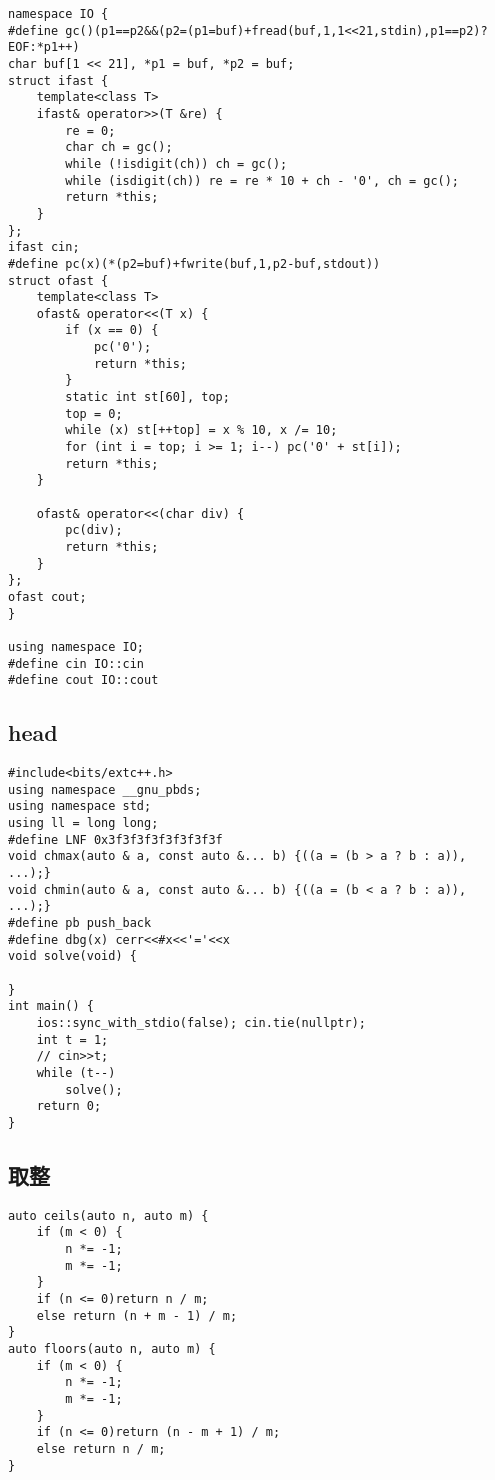 \documentclass[a4paper,10pt]{article}
\begin{document}
\noindent\begin{lstlisting}
namespace IO {
#define gc()(p1==p2&&(p2=(p1=buf)+fread(buf,1,1<<21,stdin),p1==p2)?EOF:*p1++)
char buf[1 << 21], *p1 = buf, *p2 = buf;
struct ifast {
    template<class T>
    ifast& operator>>(T &re) {
        re = 0;
        char ch = gc();
        while (!isdigit(ch)) ch = gc();
        while (isdigit(ch)) re = re * 10 + ch - '0', ch = gc();
        return *this;
    }
};
ifast cin;
#define pc(x)(*(p2=buf)+fwrite(buf,1,p2-buf,stdout))
struct ofast {
    template<class T>
    ofast& operator<<(T x) {
        if (x == 0) {
            pc('0');
            return *this;
        }
        static int st[60], top;
        top = 0;
        while (x) st[++top] = x % 10, x /= 10;
        for (int i = top; i >= 1; i--) pc('0' + st[i]);
        return *this;
    }

    ofast& operator<<(char div) {
        pc(div);
        return *this;
    }
};
ofast cout;
}

using namespace IO;
#define cin IO::cin
#define cout IO::cout\end{lstlisting}

\subsection{head}
\thispagestyle{fancy}

\noindent\begin{lstlisting}
#include<bits/extc++.h>
using namespace __gnu_pbds;
using namespace std;
using ll = long long;
#define LNF 0x3f3f3f3f3f3f3f3f
void chmax(auto & a, const auto &... b) {((a = (b > a ? b : a)), ...);}
void chmin(auto & a, const auto &... b) {((a = (b < a ? b : a)), ...);}
#define pb push_back
#define dbg(x) cerr<<#x<<'='<<x
void solve(void) {

}
int main() {
    ios::sync_with_stdio(false); cin.tie(nullptr);
    int t = 1;
    // cin>>t;
    while (t--)
        solve();
    return 0;
}\end{lstlisting}

\subsection{取整}
\thispagestyle{fancy}

\noindent\begin{lstlisting}
auto ceils(auto n, auto m) {
    if (m < 0) {
        n *= -1;
        m *= -1;
    }
    if (n <= 0)return n / m;
    else return (n + m - 1) / m;
}
auto floors(auto n, auto m) {
    if (m < 0) {
        n *= -1;
        m *= -1;
    }
    if (n <= 0)return (n - m + 1) / m;
    else return n / m;
}\end{lstlisting}
\end{document}
